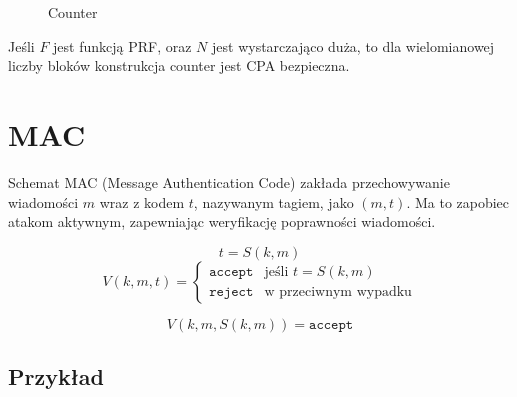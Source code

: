 \documentclass{../notatki}
\begin{document}
\begin{figure}[H]
  \centering
  \caption{Counter}
\end{figure}

Jeśli $F$ jest funkcją PRF, oraz $N$ jest wystarczająco duża, to dla
wielomianowej liczby bloków konstrukcja counter jest CPA bezpieczna.

\section{MAC}

Schemat MAC (Message Authentication Code) zakłada przechowywanie
wiadomości $m$ wraz z kodem $t$, nazywanym tagiem, jako $(m, t)$.
Ma to zapobiec atakom aktywnym, zapewniając weryfikację poprawności
wiadomości.

$$
t = S(k, m)
$$
$$
V(k, m, t) =
\begin{cases}
  \texttt{accept} & \text{jeśli } t = S(k, m) \\
  \texttt{reject} & \text{w przeciwnym wypadku}
\end{cases}
$$

$$
V(k, m, S(k, m)) = \texttt{accept}
$$

\subsection{Przykład}
\end{document}
